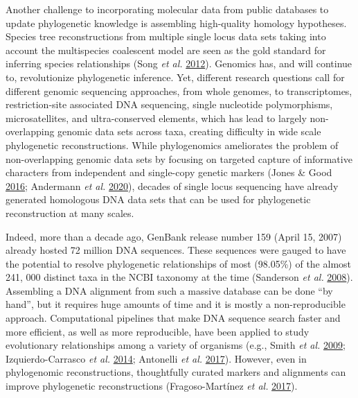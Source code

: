 \documentclass[]{article}
\begin{document}
Another challenge to incorporating molecular data from public databases to update phylogenetic knowledge is assembling high-quality homology hypotheses.
Species tree reconstructions from multiple single locus data sets taking into account the multispecies coalescent model are seen as the gold standard for inferring species relationships (Song \emph{et al.} \protect\hyperlink{ref-song2012resolving}{2012}).
Genomics has, and will continue to, revolutionize phylogenetic inference.
Yet, different research questions call for different genomic sequencing approaches, from whole genomes, to transcriptomes, restriction-site associated DNA sequencing, single nucleotide polymorphisms, microsatellites, and ultra-conserved elements, which has lead to largely non-overlapping genomic data sets across taxa, creating difficulty in wide scale phylogenetic reconstructions.
While phylogenomics ameliorates the problem of non-overlapping genomic data sets by focusing on targeted capture of informative characters from independent and single-copy genetic markers (Jones \& Good \protect\hyperlink{ref-jones2016targeted}{2016}; Andermann \emph{et al.} \protect\hyperlink{ref-andermann2020guide}{2020}), decades of single locus sequencing have already generated homologous DNA data sets that can be used for phylogenetic reconstruction at many scales.

Indeed, more than a decade ago, GenBank release number 159 (April 15, 2007) already hosted 72 million DNA sequences. These sequences were gauged to have the potential to resolve phylogenetic relationships of most (98.05\%) of the almost 241, 000 distinct taxa in the NCBI taxonomy at the time (Sanderson \emph{et al.} \protect\hyperlink{ref-sanderson2008phylota}{2008}). Assembling a DNA alignment from such a massive database can be done ``by hand'', but it requires huge amounts of time and it is mostly a non-reproducible approach. Computational pipelines that make DNA sequence search faster and more efficient, as well as more reproducible, have been applied to study evolutionary relationships among a variety of organisms (e.g., Smith \emph{et al.} \protect\hyperlink{ref-smith2009mega}{2009}; Izquierdo-Carrasco \emph{et al.} \protect\hyperlink{ref-izquierdo2014pumper}{2014}; Antonelli \emph{et al.} \protect\hyperlink{ref-antonelli2017toward}{2017}).
However, even in phylogenomic reconstructions, thoughtfully curated markers and alignments can improve phylogenetic reconstructions (Fragoso-Martínez \emph{et al.} \protect\hyperlink{ref-fragoso2017pilot}{2017}).
\end{document}
